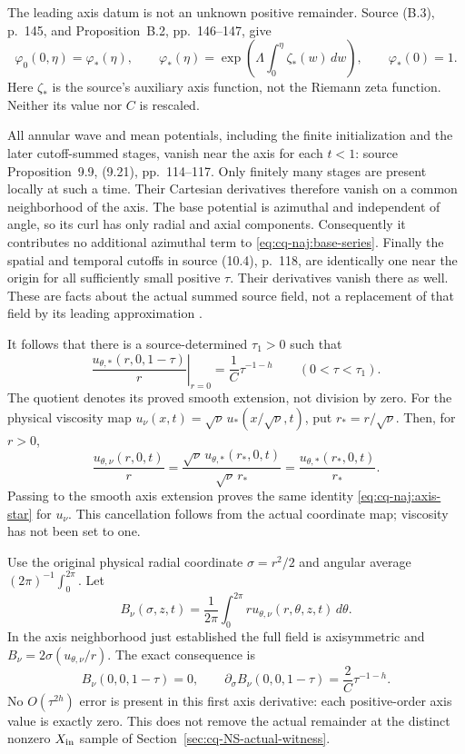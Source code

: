 The leading axis datum is not an unknown positive remainder. Source
(B.3), p.~145, and Proposition~B.2, pp.~146--147, give
\[
 \varphi_0(0,\eta)=\varphi_*(\eta),\qquad
 \varphi_*(\eta)=
  \exp\left(\Lambda\int_0^\eta\zeta_*(w)\,dw\right),\qquad
 \varphi_*(0)=1.
\]
Here \(\zeta_*\) is the source's auxiliary axis function, not the
Riemann zeta function. Neither its value nor \(C\) is rescaled.

All annular wave and mean potentials, including the finite
initialization and the later cutoff-summed stages, vanish near the axis
for each \(t<1\): source Proposition~9.9, (9.21), pp.~114--117.
Only finitely many stages are present locally at such a time. Their
Cartesian derivatives therefore vanish on a common neighborhood of the
axis. The base potential is azimuthal and independent of angle, so its
curl has only radial and axial components. Consequently it contributes
no additional azimuthal term to \eqref{eq:cq-naj:base-series}.
Finally the spatial and temporal cutoffs in source (10.4), p.~118,
are identically one near the origin for all sufficiently small
positive \(\tau\). Their derivatives vanish there as well.
These are facts about the actual summed source field, not a
replacement of that field by its leading approximation
\cite[Lemma 5.1; Proposition 5.5; (9.21); (10.4); (B.3)]{cqNS2026}.

It follows that there is a source-determined \(\tau_1>0\) such that
\begin{equation}\label{eq:cq-naj:axis-star}
 \left.\frac{u_{\theta,*}(r,0,1-\tau)}r\right|_{r=0}
       =\frac1C\tau^{-1-h}\qquad(0<\tau<\tau_1).
\end{equation}
The quotient denotes its proved smooth extension, not division by
zero. For the physical viscosity map
\(u_\nu(x,t)=\sqrt\nu\,u_*(x/\sqrt\nu,t)\), put
\(r_*=r/\sqrt\nu\). Then, for \(r>0\),
\[
 \frac{u_{\theta,\nu}(r,0,t)}r
 =\frac{\sqrt\nu\,u_{\theta,*}(r_*,0,t)}{\sqrt\nu\,r_*}
 =\frac{u_{\theta,*}(r_*,0,t)}{r_*}.
\]
Passing to the smooth axis extension proves the same identity
\eqref{eq:cq-naj:axis-star} for \(u_\nu\). This cancellation follows from the
actual coordinate map; viscosity has not been set to one.

Use the original physical radial coordinate
\(\sigma=r^2/2\) and angular average \( (2\pi)^{-1}\int_0^{2\pi}\).
Let
\[
 B_\nu(\sigma,z,t)=
    \frac1{2\pi}\int_0^{2\pi} r u_{\theta,\nu}(r,\theta,z,t)\,d\theta .
\]
In the axis neighborhood just established the full field is
axisymmetric and \(B_\nu=2\sigma(u_{\theta,\nu}/r)\).
The exact consequence is
\begin{equation}\label{eq:cq-naj:B-axis}
 B_\nu(0,0,1-\tau)=0,\qquad
 \partial_\sigma B_\nu(0,0,1-\tau)=\frac2C\tau^{-1-h}.
\end{equation}
No \(O(\tau^{2h})\) error is present in this first axis derivative:
each positive-order axis value is exactly zero. This does not remove
the actual remainder at the distinct nonzero \(X_{\rm in}\) sample
of Section~\ref{sec:cq-NS-actual-witness}.

